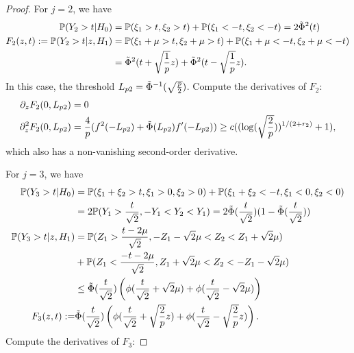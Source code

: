 \documentclass[12pt]{article}
\newcommand{\PP}{\mathbb{P}}
\def\PP{{\mathbb P}}
\theoremstyle{plain}
\begin{document}
\begin{proof}
	For $j=2$,  we have
	\begin{equation*}
		\begin{aligned}
			\PP(Y_2>t|H_0) &= \PP(\xi_1>t,\xi_2>t )+\PP(\xi_1<-t,\xi_2<-t ) = 2 \Tilde{\Phi}^2(t) \\
			F_2(z,t):= \PP(Y_2>t|z,H_1) &=  \PP(\xi_1 +\mu>t,\xi_2+\mu >t ) +\PP(\xi_1 +\mu<-t,\xi_2+\mu <-t )\\ &=\Tilde{\Phi}^2(t+\sqrt{\frac{1}{p}}z ) +\Tilde{\Phi}^2(t-\sqrt{\frac{1}{p}}z ).
		\end{aligned}
	\end{equation*}
	In this case, the threshold $L_{p 2}= \Tilde{\Phi}^{-1}(\sqrt{\frac{p}{2}} ) $. Compute the derivatives of $F_2$:
	\begin{equation*}
		\begin{aligned}
			\partial_z   F_2(0,L_{p 2}) & = 0 \\
			\partial_z^2   F_2(0,L_{p 2}) & = \frac{4 }{p} (f^2(-L_{p 2}) +\Tilde{\Phi}(L_{p 2})f'(-L_{p 2})  )\ge c ((\log(\sqrt{\frac{2}{p}}) )^{1/(2+r_2) }  +1 ),
		\end{aligned}
	\end{equation*}
	which also has a non-vanishing second-order derivative.
	
	For $j=3$, we have
	\begin{equation*}
		\begin{aligned}
			\PP(Y_3>t|H_0) &= \PP(\xi_1+\xi_2>t, \xi_1>0, \xi_2>0 )+\PP(\xi_1+\xi_2<-t, \xi_1<0, \xi_2<0 ) \\
			&= 2 \PP(Y_1 >\frac{t}{\sqrt{2}}, -Y_1<Y_2<Y_1)=  2\Tilde{\Phi}(\frac{t}{\sqrt{2}})(1-\Tilde{\Phi}(\frac{t}{\sqrt{2}}))  \\
			\PP(Y_3>t|z,H_1) &=  \PP(Z_1 >\frac{t-2\mu}{\sqrt{2}}, -Z_1-\sqrt{2}\mu<Z_2<Z_1+\sqrt{2}\mu) \\
			& + \PP(Z_1 <\frac{-t-2\mu}{\sqrt{2}}, Z_1+\sqrt{2}\mu<Z_2<-Z_1-\sqrt{2}\mu)\\ 
			&\le \Tilde{\Phi}(\frac{t}{\sqrt{2}} )\left(\phi(\frac{t}{\sqrt{2}}+\sqrt{2}\mu)+\phi(\frac{t}{\sqrt{2}}-\sqrt{2}\mu) \right)  \\
			F_3(z,t):= & \Tilde{\Phi}(\frac{t}{\sqrt{2}} )\left(\phi(\frac{t}{\sqrt{2}}+\sqrt{\frac{2}{p}}z)+\phi(\frac{t}{\sqrt{2}}-\sqrt{\frac{2}{p}}z) \right).
		\end{aligned}
	\end{equation*}
	Compute the derivatives of $F_3$:
	

\end{proof}
\end{document}

